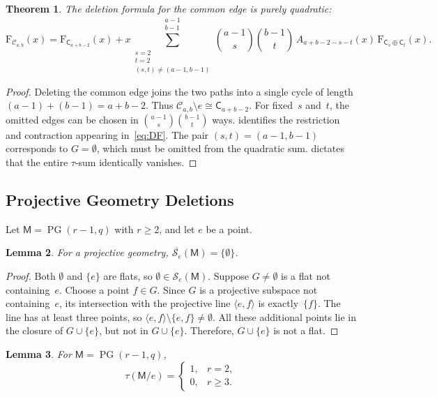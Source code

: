 \documentclass[12pt,letterpaper,english]{amsart}
\theoremstyle{teoremas}
\newtheorem{theorem}{Theorem}[section]
\newtheorem{lemma}[theorem]{Lemma}
\theoremstyle{definition}
\DeclareMathOperator{\PG}{PG}
\newcommand{\M}{\mathsf{M}}
\newcommand{\C}{\mathsf{C}}
\newcommand{\FF}{\mathrm{F}}
\newcommand{\Se}{\mathcal{S}_e}
\begin{document}
\begin{theorem}\label{thm:glued-del}
The deletion formula for the common edge is purely quadratic:
\begin{equation}\label{eq:glued-del}
\FF_{\mathcal{C}_{a,b}}(x) = \FF_{\C_{a+b-2}}(x)
  + x \sum_{\substack{s=2 \\ t=2 \\
      (s,t) \neq (a-1,b-1)}}^{\substack{a-1 \\ b-1}}
    \binom{a-1}{s} \binom{b-1}{t}\,
    A_{a+b-2-s-t}(x)\, \FF_{\C_s \oplus \C_t}(x).
\end{equation}
\end{theorem}

\begin{proof}
Deleting the common edge joins the two paths into a single cycle of
length $(a-1) + (b-1) = a+b-2$.  Thus
$\mathcal{C}_{a,b} \setminus e \cong \C_{a+b-2}$.
For fixed~$s$ and~$t$, the omitted edges can be chosen in
$\binom{a-1}{s} \binom{b-1}{t}$ ways.
 identifies the restriction and contraction
appearing in~\eqref{eq:DF}.
The pair $(s,t) = (a-1,b-1)$ corresponds to $G = \emptyset$, which
must be omitted from the quadratic sum.
 dictates that the entire $\tau$-sum identically
vanishes.
\end{proof}


\subsection{Projective Geometry Deletions}
Let $\M = \PG(r-1, q)$ with $r \ge 2$, and let $e$ be a point.

\begin{lemma}\label{lem:PG-Se}
For a projective geometry, $\overline{\Se}(\M) = \{\emptyset\}$.
\end{lemma}

\begin{proof}
Both $\emptyset$ and $\{e\}$ are flats, so $\emptyset \in \Se(\M)$.
Suppose $G \neq \emptyset$ is a flat not containing~$e$.
Choose a point $f \in G$.
Since $G$ is a projective subspace not containing~$e$, its intersection
with the projective line $\langle e, f \rangle$ is exactly~$\{f\}$.
The line has at least three points, so
$\langle e, f \rangle \setminus \{e, f\} \neq \emptyset$.
All these additional points lie in the closure of $G \cup \{e\}$, but
not in $G \cup \{e\}$.  Therefore, $G \cup \{e\}$ is not a flat.
\end{proof}

\begin{lemma}\label{lem:PG-tau}
For $\M = \PG(r-1, q)$,
\[
\tau(\M/e) =
\begin{cases}
1, & r = 2, \\
0, & r \ge 3.
\end{cases}
\]
\end{lemma}
\end{document}
